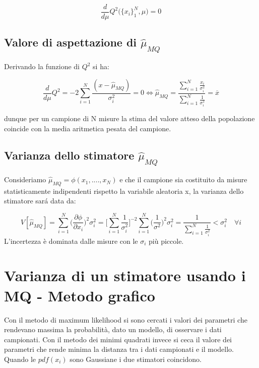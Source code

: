 \begin{equation}
	\dfrac{d}{d\mu}Q^2 \Big(\{x_i\}_1^N, \mu \Big) = 0
\end{equation}
 

\subsection{Valore di aspettazione di $\hat{\mu}_{MQ}$}

Derivando la funzione di $Q^2$ si ha:

\begin{equation*}
	\dfrac{d}{d\mu}Q^2 = -2 \sum_{i=1}^N \dfrac{(x-\hat{\mu}_{MQ})}{\sigma_i^2} = 0 \iff  \hat{\mu}_{MQ} = \dfrac{\sum_{i=1}^N \frac{x_i}{\sigma_i^2}}{\sum_{i=1}^N \frac{1}{\sigma^2_i}}= \overline{x}
\end{equation*}

\noindent dunque per un campione di N misure la stima del valore atteso della popolazione coincide con la media aritmetica pesata del campione.

\subsection{Varianza dello stimatore $\hat{\mu}_{MQ}$}

Consideriamo $\hat{\mu}_{MQ} = \phi(x_1,....,x_N)$ e che il campione sia costituito da misure statisticamente indipendenti rispetto la variabile aleatoria x, la varianza dello stimatore sar\'{a} data da:

\begin{equation*}
	V[\hat{\mu}_{MQ}] = \sum_{i=1}^{N} \Big (\dfrac{\partial \phi}{\partial x_{i}} \Big)^2 \sigma_i^2 = \Big [\sum_{i=1}^N \frac{1}{\sigma^2_i} \Big ]^{-2} \sum_{i=1}^N \Big(\dfrac{1}{\sigma^2}\Big)^2 \sigma_i^2 = \dfrac{1}{\sum_{i=1}^N \frac{1}{\sigma^2_i}} < \sigma_i^2 \quad \forall i  
\end{equation*}
L'incertezza \`{e} dominata dalle misure con le $\sigma_{i}$ pi\`{u} piccole.

\section{Varianza di un stimatore usando i MQ - Metodo grafico}

Con il metodo di maximum likelihood si sono cercati i valori dei parametri che rendevano massima la probabilit\`{a}, dato un modello, di osservare i dati campionati. Con il metodo dei minimi quadrati invece si ceca il valore dei parametri che rende minima la distanza tra i dati campionati e il modello. Quando le $pdf(x_i)$ sono Gaussiane i due stimatori coincidono.

